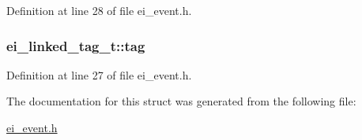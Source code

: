 Definition at line 28 of file ei\+\_\+event.\+h.

\hypertarget{structei__linked__tag__t_aa1c771b8b7ac760ee10d33d5a29c97d7}{
\subsubsection[{tag}]{ ei\+\_\+linked\+\_\+tag\+\_\+t\+::tag}}\label{structei__linked__tag__t_aa1c771b8b7ac760ee10d33d5a29c97d7}


Definition at line 27 of file ei\+\_\+event.\+h.



The documentation for this struct was generated from the following file\+:\begin{DoxyCompactItemize}
\item 
\hyperlink{ei__event_8h}{ei\+\_\+event.\+h}\end{DoxyCompactItemize}
